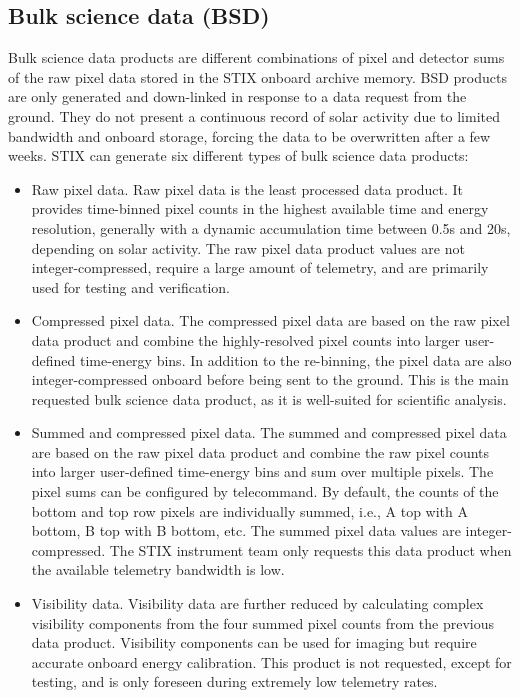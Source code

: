 \documentclass[referee]{aa} %
\begin{document}
\subsection{Bulk science data (BSD)}
Bulk science data products are different combinations of pixel and detector sums of the raw pixel data stored in the STIX onboard archive memory. BSD products are only generated and down-linked in response to a data request from the ground. They do not present a continuous record of solar activity due to limited bandwidth and onboard storage, forcing the data to be overwritten after a few weeks. STIX can generate six different types of bulk science data products: 
\begin{itemize}
 \item Raw pixel data. Raw pixel data is the least processed data product. It provides time-binned pixel counts in the highest available time and energy resolution, generally with a dynamic accumulation time between 0.5s and 20s, depending on solar activity. The raw pixel data product values are not integer-compressed, require a large amount of telemetry, and are primarily used for testing and verification.
 
\item Compressed pixel data. The compressed pixel data are based on the raw pixel data product and combine the highly-resolved pixel counts into larger user-defined time-energy bins. In addition to the re-binning, the pixel data are also integer-compressed onboard before being sent to the ground. This is the main requested bulk science data product, as it is well-suited for scientific analysis. 

\item Summed and compressed pixel data. The summed and compressed pixel data are based on the raw pixel data product and combine the raw pixel counts into larger user-defined time-energy bins and sum over multiple pixels. The pixel sums can be configured by telecommand. By default, the counts of the bottom and top row pixels are individually summed, i.e., A top with A bottom, B top with B bottom, etc. The summed pixel data values are integer-compressed. The STIX instrument team only requests this data product when the available telemetry bandwidth is low.

\item Visibility data. Visibility data are further reduced by calculating complex visibility components from the four summed pixel counts from the previous data product. Visibility components can be used for imaging but require accurate onboard energy calibration. This product is not requested, except for testing, and is only foreseen during extremely low telemetry rates.


\end{itemize}
\end{document}
